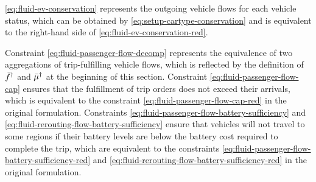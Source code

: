 \eqref{eq:fluid-ev-conservation} represents the outgoing vehicle flows for each vehicle status, which can be obtained by \eqref{eq:setup-cartype-conservation} and is equivalent to the right-hand side of \eqref{eq:fluid-ev-conservation-red}. %

Constraint \eqref{eq:fluid-passenger-flow-decomp} represents the equivalence of two aggregations of trip-fulfilling vehicle flows, which is reflected by the definition of $\bar{f}^{\dagger }_{}$ and $\bar{\mu}^{\dagger }_{}$ at the beginning of this section. %
Constraint \eqref{eq:fluid-passenger-flow-cap} ensures that the fulfillment of trip orders does not exceed their arrivals, which is equivalent to the constraint \eqref{eq:fluid-passenger-flow-cap-red} in the original formulation. %
Constraints \eqref{eq:fluid-passenger-flow-battery-sufficiency} and \eqref{eq:fluid-rerouting-flow-battery-sufficiency} ensure that vehicles will not travel to some regions if their battery levels are below the battery cost required to complete the trip, which are equivalent to the constraints \eqref{eq:fluid-passenger-flow-battery-sufficiency-red} and \eqref{eq:fluid-rerouting-flow-battery-sufficiency-red} in the original formulation. %

